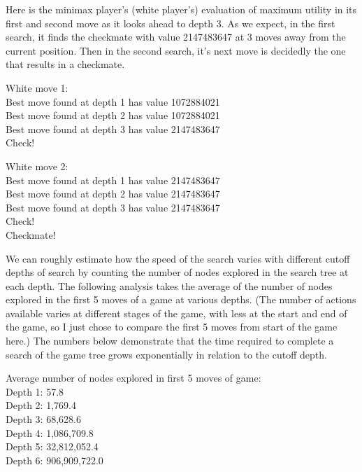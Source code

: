 \documentclass{article}
\begin{document}
Here is the minimax player's (white player's) evaluation of maximum utility in its first and second move as it looks ahead to depth 3. As we expect, in the first search, it finds the checkmate with value 2147483647 at 3 moves away from the current position. Then in the second search, it's next move is decidedly the one that results in a checkmate.

\vspace{20mm}

{\setlength{\parindent}{0cm}
White move 1:\\
Best move found at depth 1 has value 1072884021\\
Best move found at depth 2 has value 1072884021\\
Best move found at depth 3 has value 2147483647\\
Check!\\

\vspace{5mm}

White move 2:\\
Best move found at depth 1 has value 2147483647\\
Best move found at depth 2 has value 2147483647\\
Best move found at depth 3 has value 2147483647\\
Check!\\
Checkmate!\\}

We can roughly estimate how the speed of the search varies with different cutoff depths of search by counting the number of nodes explored in the search tree at each depth. The following analysis takes the average of the number of nodes explored in the first 5 moves of a game at various depths. (The number of actions available varies at different stages of the game, with less at the start and end of the game, so I just chose to compare the first 5 moves from start of the game here.) The numbers below demonstrate that the time required to complete a search of the game tree grows exponentially in relation to the cutoff depth.

\vspace{5mm}

{\setlength{\parindent}{0cm}
Average number of nodes explored in first 5 moves of game:\\
Depth 1: 57.8\\
Depth 2: 1,769.4\\
Depth 3: 68,628.6\\
Depth 4: 1,086,709.8\\
Depth 5: 32,812,052.4\\
Depth 6: 906,909,722.0}
\end{document}
